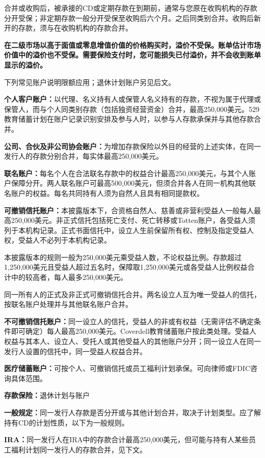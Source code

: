 \documentclass[UTF8,fontset=none,11pt,a4paper]{ctexart}
\begin{document}
合并或收购后，被承接的CD或定期存款在到期前，通常与您原在收购机构的存款分开受保；非定期存款一般分开受保至收购后六个月。之后同类别合并。收购后新开的存款，须与在收购机构的存款合并。


\textbf{在二级市场以高于面值或零息增值价值的价格购买时，溢价不受保。账单估计市场价值中的溢价也不受保。需要保险支付时，您可能损失已付溢价，并不会收到账单显示的溢价。}


下列常见账户说明限额应用；退休计划账户另见后文。


\textbf{个人客户账户：}以代理、名义持有人或保管人名义持有的存款，不视为属于代理或保管人，而与个人同类别存款（包括独资经营资金）合并，最高250,000美元。529教育储蓄计划在账户记录识别安排及参与人时，以参与人存款承保并与其他存款合并。


\textbf{公司、合伙及非公司协会账户：}为增加存款保险以外目的经营的上述实体，在同一发行人的存款分别合并，每实体最高250,000美元。


\textbf{联名账户：}每名个人在合法联名存款中的权益合计最高250,000美元，与其个人账户保障分开。两人联名账户可最高500,000美元，但须合并各人在同一机构其他联名账户的权益。每名共同持有人须为自然人且具有相同提款权。


\textbf{可撤销信托账户：}本披露版本下，合资格自然人、慈善或非营利受益人一般每人最高250,000美元。非正式信托包括死亡支付、死亡转移或Totten账户，各受益人须列于本机构记录。正式书面信托中，设立人生前保留所有权、控制及指定受益人权，受益人不必列于本机构记录。


本披露版本的规则一般为250,000美元乘受益人数，不论权益比例。存款超过1,250,000美元且受益人超过五名时，保障取1,250,000美元或各受益人比例权益合计中的较高者，每人最多250,000美元。


同一所有人的正式及非正式可撤销信托合并。两名设立人互为唯一受益人的信托，按联名账户处理并与其他联名账户合并。


\textbf{不可撤销信托账户：}同一设立人的信托，受益人的非或有权益（无需评估不确定条件即可确定）每人最高250,000美元。Coverdell教育储蓄账户按此类处理。受益人权益与其本人、设立人、受托人或其他受益人的其他账户分开；同一设立人在同一发行人设置的信托中，同一受益人权益合并。


\textbf{医疗储蓄账户：}可按个人、可撤销信托或员工福利计划承保。可向律师或FDIC咨询具体范围。


\textbf{存款保险：}退休计划与账户


\textbf{一般规定：}同一发行人存款是否分开或与其他计划合并，取决于计划类型。应了解持有CD的计划性质，以下为一般规则。


\textbf{IRA：}同一发行人在IRA中的存款合计最高250,000美元，但可能与持有人某些员工福利计划同一发行人的存款合并，见下文。
\end{document}
